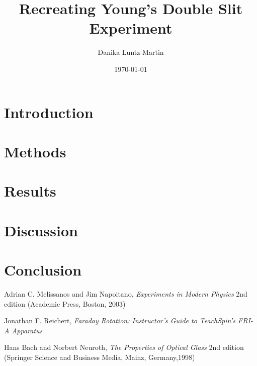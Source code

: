 \documentclass[prb,preprint]{revtex4-1}
\begin{document}
\title{Recreating Young's Double Slit Experiment}


\author{}
\email{}
\affiliation{}


\author{Danika Luntz-Martin}


\date{\today}



\begin{abstract}


\end{abstract}

\maketitle 


\section{Introduction} 


\section{Methods}


\section{Results}


\section{Discussion}


\section{Conclusion}

\begin{thebibliography}{3}

 Adrian C. Melissanos and Jim Napoitano, \textit{Experiments in Modern Physics} 2nd edition (Academic Press, Boston, 2003)

 Jonathan F. Reichert, \textit{Faraday Rotation: Instructor's Guide to TeachSpin's FRI-A Apparatus}

 Hans Bach and Norbert Neuroth, \textit{The Properties of Optical Glass} 2nd edition (Springer Science and Business Media, Mainz, Germany,1998)

\end{thebibliography}
\end{document}
